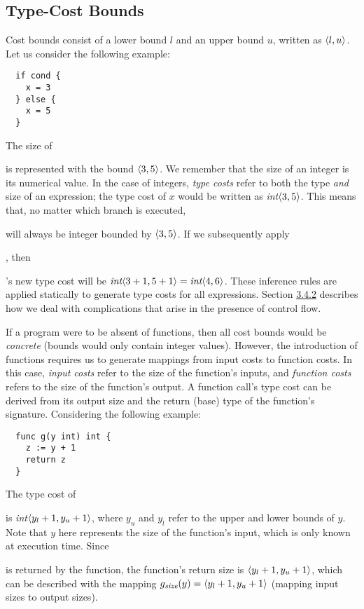 \subsection{Type-Cost Bounds}


\label{sec:2.5.1}

Cost bounds consist of a lower bound \( l \) and an upper bound \( u \), written as \( \langle{l, u}\rangle \). Let us consider the following example:

\newpage

\begin{verbatim}
  if cond { 
    x = 3 
  } else { 
    x = 5
  }
\end{verbatim}


The size of  is represented with the bound \( \langle{3, 5}\rangle \). We remember that the size of an integer is its numerical value. In the case of integers, \textit{type costs} refer to both the type \textit{and} size of an expression; the type cost of \( x \) would be written as \textit{int}\(\langle{3, 5}\rangle\). This means that, no matter which branch is executed,  will always be integer bounded by \( \langle{3, 5}\rangle \). If we subsequently apply , then 's new type cost will be \( \textit{int}\langle{3 + 1, 5 + 1}\rangle = \textit{int}\langle{4, 6}\rangle \). These inference rules are applied statically to generate type costs for all expressions. Section \hyperref[sec:3.4.2]{3.4.2} describes how we deal with complications that arise in the presence of control flow.

If a program were to be absent of functions, then all cost bounds would be \textit{concrete} (bounds would only contain integer values). However, the introduction of functions requires us to generate mappings from input costs to function costs. In this case, \textit{input costs} refer to the size of the function's inputs, and \textit{function costs} refers to the size of the function's output. A function call's type cost can be derived from its output size and the return (base) type of the function's signature. Considering the following example:


\begin{verbatim}
  func g(y int) int { 
    z := y + 1 
    return z 
  }
\end{verbatim}



The type cost of  is \textit{int}\( \langle{y_l + 1, y_u + 1}\rangle \), where \( y_u \) and \( y_l \) refer to the upper and lower bounds of \( y \). Note that \( y \) here represents the size of the function's input, which is only known at execution time. Since  is returned by the function, the function's return size is \( \langle{y_l + 1, y_u + 1}\rangle \), which can be described with the mapping \( g_{\textit{size}}(y) = \langle{y_l + 1, y_u + 1}\rangle \) (mapping input sizes to output sizes).

